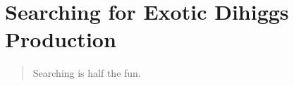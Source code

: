 \chapter{Searching for Exotic Dihiggs Production}
\label{sec:dihiggs}
\begin{quote}
Searching is half the fun. \\
\end{quote}













